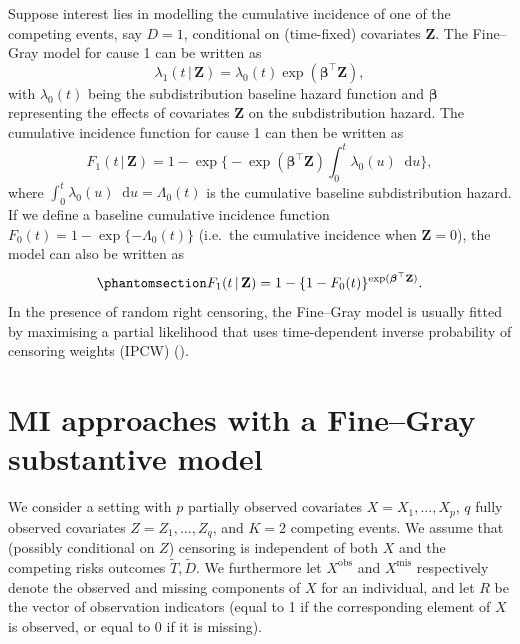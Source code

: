 \documentclass[
  letterpaper,
  paper=240mm:170mm,
  twoside=true,
  open=right,
  fontsize=10pt,
  pagesize=false,
  BCOR=15mm,
  DIV=14,
  headinclude=true,
  footinclude=false,
  headsepline=on]{scrbook}
\newcommand{\given}{\,|\,}
\newcommand\diff{\mathop{}\!\mathrm{d}}
\begin{document}
Suppose interest lies in modelling the cumulative incidence of one of
the competing events, say \(D = 1\), conditional on (time-fixed)
covariates \(\mathbf{Z}\). The Fine--Gray model for cause 1 can be
written as \begin{equation*}
    \lambda_1(t \given \mathbf{Z}) = \lambda_{0}(t)\exp(\boldsymbol{\beta}^\top \mathbf{Z}),
\end{equation*} with \(\lambda_{0}(t)\) being the subdistribution
baseline hazard function and \(\boldsymbol{\beta}\) representing the
effects of covariates \(\mathbf{Z}\) on the subdistribution hazard. The
cumulative incidence function for cause 1 can then be written as
\begin{equation*}
    F_1(t \given \mathbf{Z}) = 1 - \exp \Biggl\{ -\exp(\boldsymbol{\beta}^\top \mathbf{Z}) \int_{0}^{t} \lambda_{0}(u)\diff u \Biggr\},
\end{equation*} where
\(\int_{0}^{t} \lambda_{0}(u)\diff u = \Lambda_0(t)\) is the cumulative
baseline subdistribution hazard. If we define a baseline cumulative
incidence function \(F_{0}(t) = 1 - \exp\{-\Lambda_0(t)\}\) (i.e.~the
cumulative incidence when \(\mathbf{Z} = 0\)), the model can also be
written as \begin{equation}\phantomsection\label{eq-cuminc-comp}{
F_1(t \given \mathbf{Z}) = 1 - \{1 - F_{0}(t)\}^{\exp(\boldsymbol{\beta}^\top \mathbf{Z})}.
}\end{equation} In the presence of random right censoring, the
Fine--Gray model is usually fitted by maximising a partial likelihood
that uses time-dependent inverse probability of censoring weights (IPCW)
().

\section{MI approaches with a Fine--Gray substantive
model}\label{sec-methods}

We consider a setting with \(p\) partially observed covariates
\(X = X_1,...,X_p\), \(q\) fully observed covariates
\(Z = Z_1,...,Z_q\), and \(K = 2\) competing events. We assume that
(possibly conditional on \(Z\)) censoring is independent of both \(X\)
and the competing risks outcomes \(\tilde{T}, \tilde{D}\). We
furthermore let \(X^{\text{obs}}\) and \(X^{\text{mis}}\) respectively
denote the observed and missing components of \(X\) for an individual,
and let \(R\) be the vector of observation indicators (equal to 1 if the
corresponding element of \(X\) is observed, or equal to 0 if it is
missing).
\end{document}
